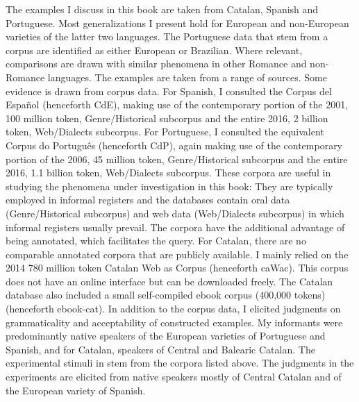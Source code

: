 The examples I discuss in this book are taken from Catalan,  Spanish and Portuguese. Most generalizations I present hold for European and non-European varieties of the latter two languages. The Portuguese data that stem from a corpus are identified as either European or Brazilian. Where relevant, comparisons are drawn with similar phenomena in other Romance and non-Romance languages. The examples are taken from  a range of sources. Some evidence  is drawn from corpus data. For Spanish, I consulted the Corpus del Espa\~nol (henceforth CdE), making use of the contemporary portion of the 2001,	100 million token, Genre/Historical subcorpus and the entire 2016, 2 billion token, Web/Dialects subcorpus.  For Portuguese, I consulted the equivalent Corpus do Português (henceforth CdP), again making use of the contemporary portion of the 2006,  45 million token, Genre/Historical subcorpus and the entire 2016, 1.1 billion token,   Web/Dialects subcorpus. These corpora are useful in studying the phenomena  under investigation in this book: They  are typically employed in informal registers and the databases contain oral data (Genre/Historical subcorpus)  and web data (Web/Dialects subcorpus) in which informal registers usually prevail. The corpora have the additional advantage of being annotated,  which facilitates the query. For Catalan, there are no comparable annotated corpora that are publicly available. I  mainly relied on the 2014 780 million token Catalan Web as Corpus  (henceforth caWac). This corpus  does not have an online interface but can be  downloaded freely. The Catalan database also included a small self-compiled ebook corpus (400,000 tokens) (henceforth ebook-cat). In addition to the corpus data, I elicited judgments on grammaticality and acceptability  of constructed examples. My informants were predominantly  native speakers of the European varieties of Portuguese and Spanish, and  for Catalan, speakers of Central and Balearic Catalan. The experimental stimuli  in  stem from the corpora listed above. The judgments in the experiments are elicited from native speakers  mostly of Central Catalan and  of the European variety of Spanish.

